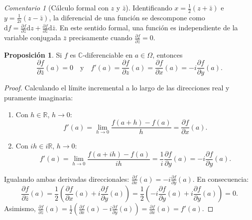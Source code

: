 \documentclass[11pt,a4paper]{article}
\theoremstyle{definition}
\newtheorem{proposicion}{Proposición}[section]
\theoremstyle{remark}
\newtheorem{observacion}{Comentario}[section]
\numberwithin{equation}{section}
\begin{document}
\begin{observacion}[Cálculo formal con $z$ y $\bar{z}$]
Identificando $x = \frac{1}{2}(z + \bar{z})$ e $y = \frac{1}{2i}(z - \bar{z})$, la diferencial de una función se descompone como $\mathrm{d}f = \frac{\partial f}{\partial z} \mathrm{d}z + \frac{\partial f}{\partial \bar{z}} \mathrm{d}\bar{z}$. En este sentido formal, una función es independiente de la variable conjugada $\bar{z}$ precisamente cuando $\frac{\partial f}{\partial \bar{z}} = 0$.
\end{observacion}

\begin{proposicion}
Si $f$ es $\mathbb{C}$-diferenciable en $a \in \Omega$, entonces
\begin{equation}
\frac{\partial f}{\partial \bar{z}}(a) = 0 \quad \text{y} \quad f'(a) = \frac{\partial f}{\partial z}(a) = \frac{\partial f}{\partial x}(a) = -i\frac{\partial f}{\partial y}(a).
\end{equation}
\end{proposicion}
\begin{proof}
Calculando el límite incremental a lo largo de las direcciones real y puramente imaginaria:
\begin{enumerate}
\item Con $h \in \mathbb{R}$, $h \to 0$:
\[
f'(a) = \lim_{h \to 0} \frac{f(a+h) - f(a)}{h} = \frac{\partial f}{\partial x}(a).
\]
\item Con $ih \in i\mathbb{R}$, $h \to 0$:
\[
f'(a) = \lim_{h \to 0} \frac{f(a+ih) - f(a)}{ih} = \frac{1}{i} \frac{\partial f}{\partial y}(a) = -i \frac{\partial f}{\partial y}(a).
\]
\end{enumerate}
Igualando ambas derivadas direccionales: $\frac{\partial f}{\partial x}(a) = -i\frac{\partial f}{\partial y}(a)$. En consecuencia:
\[
\frac{\partial f}{\partial \bar{z}}(a) = \frac{1}{2} \left( \frac{\partial f}{\partial x}(a) + i \frac{\partial f}{\partial y}(a) \right) = \frac{1}{2} \left( -i\frac{\partial f}{\partial y}(a) + i\frac{\partial f}{\partial y}(a) \right) = 0.
\]
Asimismo, $\frac{\partial f}{\partial z}(a) = \frac{1}{2}\left(\frac{\partial f}{\partial x}(a) - i\frac{\partial f}{\partial y}(a)\right) = \frac{\partial f}{\partial x}(a) = f'(a)$.
\end{proof}
\end{document}
